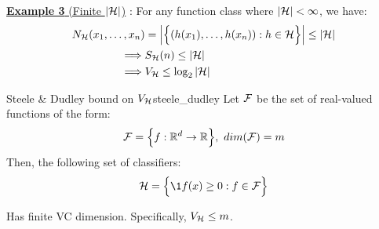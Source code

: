\noindent\newline\underline{\textbf{Example 3 } (Finite $|\mathcal{H}|$)} : For any function class where $|\mathcal{H}|<\infty$, we have:
\begin{align*}
    N_{\mathcal{H}}(x_1, \dots, x_n) &= \Big| \Big\{ 
        (h(x_1), \dots, h(x_n)) : h \in \mathcal{H}
     \Big\} \Big| \le |\mathcal{H}| \\
    \implies& S_{\mathcal{H}}(n) \le |\mathcal{H}| \\
    \implies& V_{\mathcal{H}} \le \log_2|\mathcal{H}|
\end{align*}

\begin{proposition}{Steele \& Dudley bound on $V_{\mathcal{H}}$}{steele_dudley}
    Let $\mathcal{F}$ be the set of real-valued functions of the form:
    \begin{align*}
        \mathcal{F} = \Big\{ 
            f: \mathbb{R}^d \to \mathbb{R}
         \Big\}, \ dim(\mathcal{F}) = m
    \end{align*}
    \noindent Then, the following set of classifiers:
    \begin{align*}
        \Hf = \bigCurl{
            \1{f(x) \ge 0} : f \in \F
        }
    \end{align*}

    \noindent Has finite VC dimension. Specifically, $V_{\mathcal{H}} \le m$.
\end{proposition}


